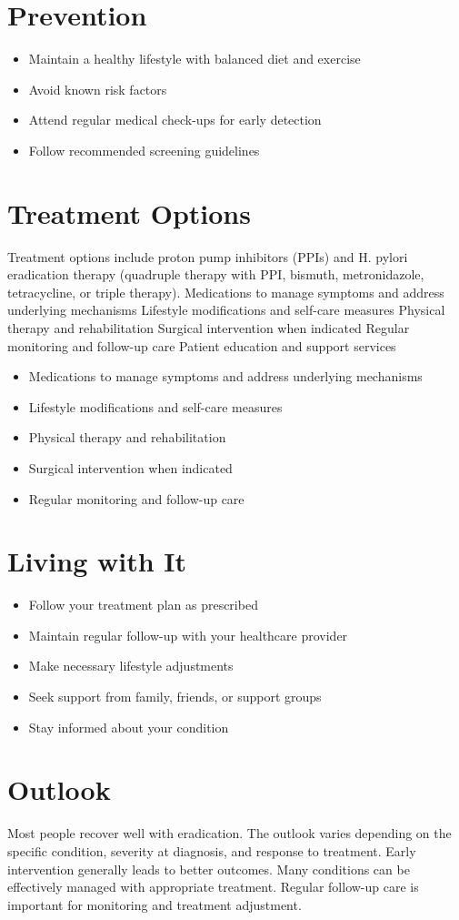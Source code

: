 \section{Prevention}
\begin{itemize}[noitemsep]
  \item Maintain a healthy lifestyle with balanced diet and exercise
  \item Avoid known risk factors
  \item Attend regular medical check-ups for early detection
  \item Follow recommended screening guidelines
\end{itemize}
\section{Treatment Options}
Treatment options include proton pump inhibitors (PPIs) and H. pylori eradication therapy (quadruple therapy with PPI, bismuth, metronidazole, tetracycline, or triple therapy). Medications to manage symptoms and address underlying mechanisms Lifestyle modifications and self-care measures Physical therapy and rehabilitation Surgical intervention when indicated Regular monitoring and follow-up care Patient education and support services

\begin{itemize}[noitemsep]
  \item Medications to manage symptoms and address underlying mechanisms
  \item Lifestyle modifications and self-care measures
  \item Physical therapy and rehabilitation
  \item Surgical intervention when indicated
  \item Regular monitoring and follow-up care
\end{itemize}
\section{Living with It}
\begin{itemize}[noitemsep]
  \item Follow your treatment plan as prescribed
  \item Maintain regular follow-up with your healthcare provider
  \item Make necessary lifestyle adjustments
  \item Seek support from family, friends, or support groups
  \item Stay informed about your condition
\end{itemize}
\section{Outlook}
Most people recover well with eradication. The outlook varies depending on the specific condition, severity at diagnosis, and response to treatment. Early intervention generally leads to better outcomes. Many conditions can be effectively managed with appropriate treatment. Regular follow-up care is important for monitoring and treatment adjustment.
